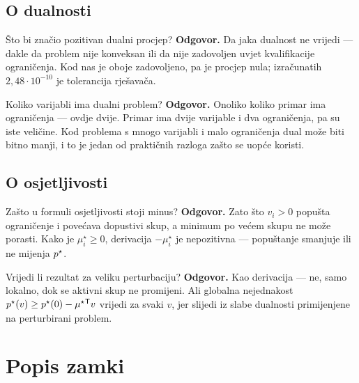 \subsection{O dualnosti}

\begin{pitanje}{Što bi značio pozitivan dualni procjep?}
\textbf{Odgovor.} Da jaka dualnost ne vrijedi --- dakle da problem nije konveksan
ili da nije zadovoljen uvjet kvalifikacije ograničenja. Kod nas je oboje
zadovoljeno, pa je procjep nula; izračunatih $2{,}48\cdot10^{-10}$ je tolerancija
rješavača.
\end{pitanje}

\begin{pitanje}{Koliko varijabli ima dualni problem?}
\textbf{Odgovor.} Onoliko koliko primar ima ograničenja --- ovdje dvije. Primar
ima dvije varijable i dva ograničenja, pa su iste veličine. Kod problema s mnogo
varijabli i malo ograničenja dual može biti bitno manji, i to je jedan od
praktičnih razloga zašto se uopće koristi.
\end{pitanje}

\subsection{O osjetljivosti}

\begin{pitanje}{Zašto u formuli osjetljivosti stoji minus?}
\textbf{Odgovor.} Zato što $v_i > 0$ popušta ograničenje i povećava dopustivi
skup, a minimum po većem skupu ne može porasti. Kako je $\mu_i^{\star} \geq 0$,
derivacija $-\mu_i^{\star}$ je nepozitivna --- popuštanje smanjuje ili ne mijenja
$p^{\star}$.
\end{pitanje}

\begin{pitanje}{Vrijedi li rezultat za veliku perturbaciju?}
\textbf{Odgovor.} Kao derivacija --- ne, samo lokalno, dok se aktivni skup ne
promijeni. Ali globalna nejednakost
$p^{\star}(v) \geq p^{\star}(0) - \mu^{\star}{}^{\mathsf{T}} v$ vrijedi za svaki $v$, jer slijedi iz
slabe dualnosti primijenjene na perturbirani problem.
\end{pitanje}

\section{Popis zamki}
\label{sec:z1o-zamke}

